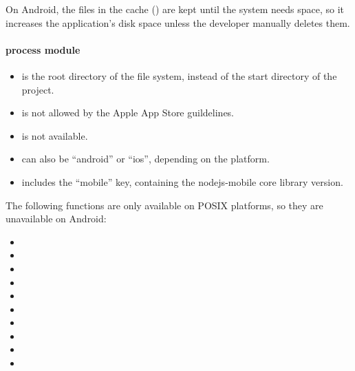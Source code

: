 On Android, the files in the cache () are kept until the system needs space, so it increases the application's disk space unless the developer manually deletes them.

\newpage

\paragraph{process module}

\begin{itemize}
  \setlength\itemsep{-0.5em}
  \item {} is the root directory of the file system, instead of the start directory of the project.
  \item {} is not allowed by the Apple App Store guildelines.
  \item {} is not available.
  \item {} can also be \enquote{android} or \enquote{ios}, depending on the platform.
  \item {} includes the \enquote{mobile} key, containing the nodejs-mobile core library version.
\end{itemize}

The following functions are only available on POSIX platforms, so they are unavailable on Android:

\begin{itemize}
  \setlength\itemsep{-0.8em}
  \item {}
  \item {}
  \item {}
  \item {}
  \item {}
  \item {}
  \item {}
  \item {}
  \item {}
  \item {}
\end{itemize}
